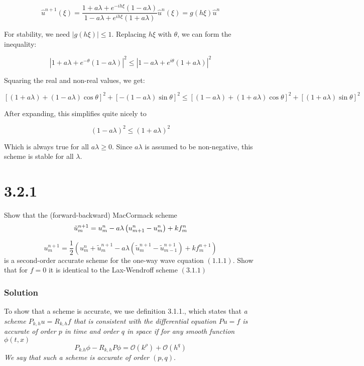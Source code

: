 \documentclass[12pt]{article}
\begin{document}
$$\hat{u}^{n+1}(\xi) = \frac{1 + {a\lambda} + e^{-ih\xi}\left(1 - a\lambda\right)}{1 - {a\lambda} + e^{ih\xi}\left(1+ a\lambda\right)}\hat{u}^n(\xi) = g(h\xi)\hat{u}^n$$

\noindent For stability, we need $|g(h\xi)|\leq1$. Replacing $h\xi$ with $\theta$, we can form  the inequality:

$$\left|1 + {a\lambda} + e^{-\theta}\left(1 - a\lambda\right)\right|^2 \leq \left|1 - {a\lambda} + e^{i\theta}\left(1+ {a\lambda}\right)\right|^2$$

\noindent Squaring the real and non-real values, we get:

$$ [(1+a\lambda)+(1-a\lambda)\cos\theta]^2 + [-(1-a\lambda)\sin\theta]^2 \leq [(1-a\lambda)+(1+a\lambda)\cos\theta]^2 + [(1+a\lambda)\sin\theta]^2$$

\noindent After expanding, this simplifies quite nicely to

$$ (1-a\lambda)^2 \leq (1+a\lambda)^2 $$

\noindent Which is always true for all $a\lambda \geq 0$. Since $a\lambda$ is assumed to be non-negative, this scheme is stable for all $\lambda$.

\section*{3.2.1}
Show that the (forward-backward) MacCormack scheme
$$
{\tilde{u}_{m}^{n+1}=u_{m}^{n}-a \lambda\left(u_{m+1}^{n}-u_{m}^{n}\right)+k f_{m}^{n}} \\$$

$$
{u_{m}^{n+1}=\frac{1}{2}\left(u_{m}^{n}+\tilde{u}_{m}^{n+1}-a \lambda\left(\tilde{u}_{m}^{n+1}-\tilde{u}_{m-1}^{n+1}\right)+k f_{m}^{n+1}\right)}
$$
is a second-order accurate scheme for the one-way wave cquation $(1.1 .1) .$ Show that for $f=0$ it is identical to the Lax-Wendroff scheme $(3.1 .1)$

\subsubsection*{Solution}

To show that a scheme is accurate, we use definition 3.1.1., which states that \textit{a scheme $P_{k, h} u=R_{k, h} f$ that is consistent with the differential equation $P u=f$ is accurate of order $p$ in time and order $q$ in space if for any smooth function $\phi(t, x)$
$$
P_{k . h} \phi-R_{k, h} P \phi=\mathcal{O}\left(k^{\rho}\right)+\mathcal{O}\left(h^{q}\right)
$$
We say that such a scheme is accurate of order $(p, q)$}. 
\end{document}
